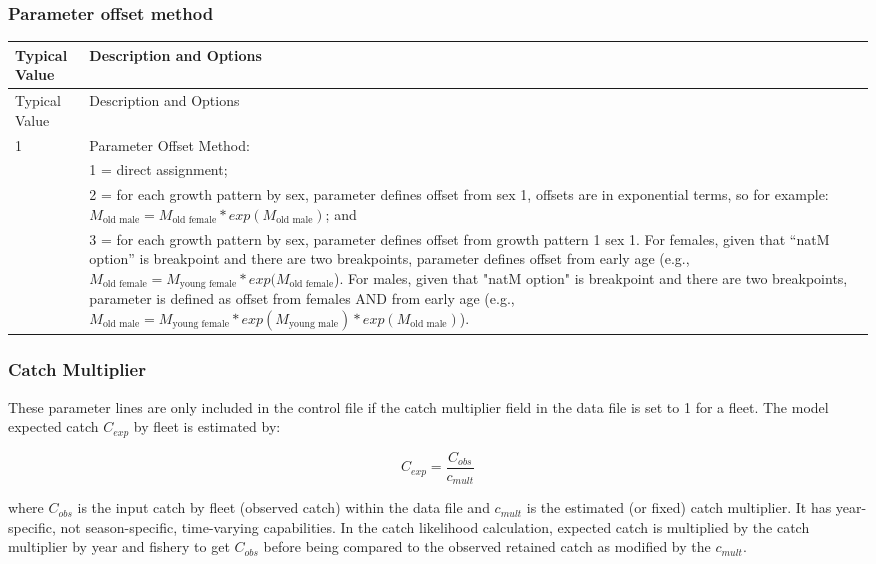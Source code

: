 \pagebreak
\hypertarget{offset}{}
\subsubsection{Parameter offset method}

\begin{longtable}{p{0.5cm} p{2cm} p{13cm}}
	\hline	
	\multicolumn{2}{l}{Typical Value} & Description and Options\Tstrut\Bstrut\\
	\hline
	\endfirsthead

	\hline
	\multicolumn{2}{l}{Typical Value} & Description and Options\Tstrut\Bstrut\\
	\hline
	\endhead
	\hline

	\endfoot
	
	\endlastfoot

	 1 & & Parameter Offset Method: \Tstrut\Bstrut\\
	   & & 1 = direct assignment; \\
	   & & 2 = for each growth pattern by sex, parameter defines offset from sex 1, offsets are in exponential terms, so for example: $M_{\text{old male}} = M_{\text{old female}}*exp(M_{\text{old male}})$; and\\
	   & & 3 = for each growth pattern by sex, parameter defines offset from growth pattern 1 sex 1.  For females, given that “natM option” is breakpoint and there are two breakpoints, parameter defines offset from early age (e.g., $M_{\text{old female}} = M_{\text{young female}}*exp(M_{\text{old female}}$). For males, given that "natM option" is breakpoint and there are two breakpoints, parameter is defined as offset from females AND from early age (e.g., $M_{\text{old male}} = M_{\text{young female}}*exp(M_{\text{young male}})*exp(M_{\text{old male}})$).\Bstrut\\
	\hline
\end{longtable}


\subsubsection{Catch Multiplier}
These  parameter lines are only included in the control file if the catch multiplier field in the data file is set to 1 for a fleet. The model expected catch $C_{exp}$ by fleet is estimated by:

\begin{equation}
C_{exp} =  \frac{C_{obs}}{c_{mult}}
\end{equation}

where $C_{obs}$ is the input catch by fleet (observed catch) within the data file and $c_{mult}$ is the estimated (or fixed) catch multiplier. It has year-specific, not season-specific, time-varying capabilities.  In the catch likelihood calculation, expected catch is multiplied by the catch multiplier by year and fishery to get $C_{obs}$ before being compared to the observed retained catch as modified by the $c_{mult}$.  


